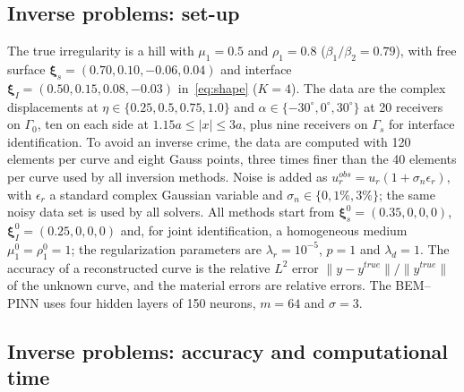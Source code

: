 \documentclass[11pt,twoside]{article}
\begin{document}
\subsection{Inverse problems: set-up}\label{sec:setup}

The true irregularity is a hill with $\mu_1=0.5$ and $\rho_1=0.8$ ($\beta_1/\beta_2=0.79$), with free surface $\boldsymbol{\xi}_s = (0.70, 0.10, -0.06, 0.04)$ and interface $\boldsymbol{\xi}_I = (0.50, 0.15, 0.08, -0.03)$ in~\eqref{eq:shape} ($K=4$). The data are the complex displacements at $\eta\in\{0.25,0.5,0.75,1.0\}$ and $\alpha\in\{-30^\circ,0^\circ,30^\circ\}$ at 20 receivers on $\Gamma_0$, ten on each side at $1.15a\le|x|\le 3a$, plus nine receivers on $\Gamma_s$ for interface identification. To avoid an inverse crime, the data are computed with 120 elements per curve and eight Gauss points, three times finer than the 40 elements per curve used by all inversion methods. Noise is added as $u^{obs}_r = u_r(1+\sigma_n\epsilon_r)$, with $\epsilon_r$ a standard complex Gaussian variable and $\sigma_n\in\{0, 1\%, 3\%\}$; the same noisy data set is used by all solvers. All methods start from $\boldsymbol{\xi}_s^0=(0.35,0,0,0)$, $\boldsymbol{\xi}_I^0=(0.25,0,0,0)$ and, for joint identification, a homogeneous medium $\mu_1^0=\rho_1^0=1$; the regularization parameters are $\lambda_r=10^{-5}$, $p=1$ and $\lambda_d=1$. The accuracy of a reconstructed curve is the relative $L^2$ error $\|y-y^{true}\|/\|y^{true}\|$ of the unknown curve, and the material errors are relative errors. The BEM--PINN uses four hidden layers of 150 neurons, $m=64$ and $\sigma=3$.

\subsection{Inverse problems: accuracy and computational time}\label{sec:inverse_results}

\begin{table}[ht!]
\centering
\caption{Inversion results. Error: relative $L^2$ error of the unknown curve (largest of shape and material errors for joint identification). Solves: number of forward evaluations of~\eqref{eq:classical} (assembly and LU solve for four frequencies); assemblies: number of loss evaluations with re-assembly of the BEM matrices. Classical solvers ran alone on the machine; three BEM--PINN runs shared it.}
\label{tab:inverse}
\scriptsize
\setlength{\tabcolsep}{4pt}

\end{table}
\end{document}
